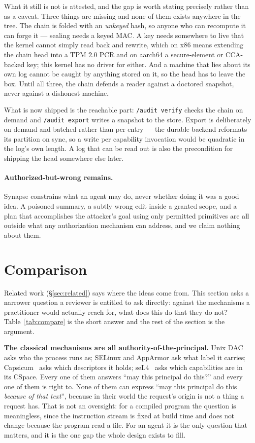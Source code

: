 \documentclass[11pt]{article}
\newcommand{\syn}{Synapse}
\newcommand{\code}[1]{\texttt{#1}}
\begin{document}
What it still is not is attested, and the gap is worth stating precisely rather
than as a caveat. Three things are missing and none of them exists anywhere in
the tree. The chain is folded with an \emph{unkeyed} hash, so anyone who can
recompute it can forge it --- sealing needs a keyed MAC. A key needs somewhere
to live that the kernel cannot simply read back and rewrite, which on x86 means
extending the chain head into a TPM 2.0 PCR and on aarch64 a secure-element or
CCA-backed key; this kernel has no driver for either. And a machine that lies
about its own log cannot be caught by anything stored on it, so the head has to
leave the box. Until all three, the chain defends a reader against a doctored
snapshot, never against a dishonest machine.

What is now shipped is the reachable part: \code{/audit verify} checks the chain
on demand and \code{/audit export} writes a snapshot to the store. Export is
deliberately on demand and batched rather than per entry --- the durable backend
reformats its partition on sync, so a write per capability invocation would be
quadratic in the log's own length. A log that can be read out is also the
precondition for shipping the head somewhere else later.

\paragraph{Authorized-but-wrong remains.} \syn{} constrains what an agent may
do, never whether doing it was a good idea. A poisoned summary, a subtly wrong
edit inside a granted scope, and a plan that accomplishes the attacker's goal
using only permitted primitives are all outside what any authorization
mechanism can address, and we claim nothing about them.

\section{Comparison}
\label{sec:compare}

Related work (\S\ref{sec:related}) says where the ideas come from. This section
asks a narrower question a reviewer is entitled to ask directly: against the
mechanisms a practitioner would actually reach for, what does this do that they
do not? Table~\ref{tab:compare} is the short answer and the rest of the section
is the argument.

\textbf{The classical mechanisms are all authority-of-the-principal.} Unix DAC
asks who the process runs as; SELinux and AppArmor ask what label it carries;
Capsicum~\cite{watson2010capsicum} asks which descriptors it holds;
seL4~\cite{klein2009sel4} asks which capabilities are in its CSpace. Every one
of them answers ``may this principal do this?'' and every one of them is right to.
None of them can express ``may this principal do this \emph{because of that
text}'', because in their world the request's origin is not a thing a request
has. That is not an oversight: for a compiled program the question is
meaningless, since the instruction stream is fixed at build time and does not
change because the program read a file. For an agent it is the only question
that matters, and it is the one gap the whole design exists to fill.
\end{document}
